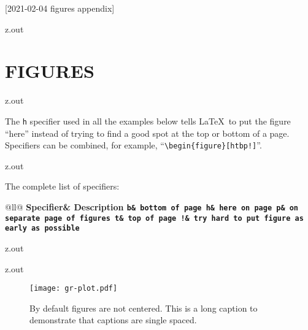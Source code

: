 [2021-02-04 figures appendix]

\begin{VerbatimOut}{z.out}
\chapter{FIGURES}

\end{VerbatimOut}

\MyIO


\begin{VerbatimOut}{z.out}

The
\verb+h+
specifier used in all the examples below
tells \LaTeX\ to put the figure
``here''
instead of trying
to find a good spot
at the top or bottom of a page.
Specifiers can be combined,
for example,
``\verb+\begin{figure}[htbp!]+''.
\end{VerbatimOut}

\MyIO


\begin{VerbatimOut}{z.out}

The complete list of specifiers:
\vspace*{6pt}
\begin{center}
  \begin{tabular}{@{}ll@{}}
    \toprule
    \bf Specifier& \bf Description\cr
    \midrule
    \noalign{\vspace*{2pt}}
    \tt b& bottom of page\cr
    \tt h& here on page\cr
    \tt p& on separate page of figures\cr
    \tt t& top of page\cr
    \tt !& try hard to put figure as early as possible\cr
    \bottomrule
  \end{tabular}
\end{center}
\end{VerbatimOut}

\MyIO



\begin{VerbatimOut}{z.out}

\end{VerbatimOut}

\MyIO


\begin{VerbatimOut}{z.out}

\begin{figure}[ht]
  \texttt{[image: gr-plot.pdf]}
  \caption{%
    By default figures are not centered.
    This is a long caption to demonstrate that captions are single spaced.%
  }
  \label{fi:not-centered}
\end{figure}
\end{VerbatimOut}

